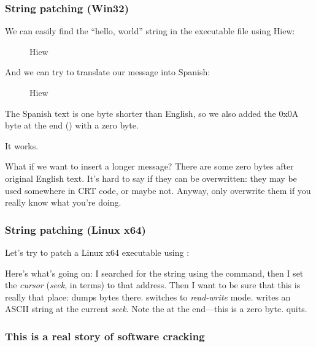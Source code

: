 \subsubsection{String patching (Win32)}

We can easily find the ``hello, world'' string in the executable file using Hiew:

\begin{figure}[H]
\centering
{}
\caption{Hiew}
\label{}
\end{figure}

And we can try to translate our message into Spanish:

\begin{figure}[H]
\centering
{}
\caption{Hiew}
\label{}
\end{figure}

The Spanish text is one byte shorter than English, so we also added the 0x0A byte at the end () with a zero byte.

It works.

What if we want to insert a longer message?
There are some zero bytes after original English text.
It's hard to say if they can be overwritten: they may be used somewhere in \ac{CRT} code, or maybe not.
Anyway, only overwrite them if you really know what you're doing.

\subsubsection{String patching (Linux x64)}

\myindex{\radare}
Let's try to patch a Linux x64 executable using \radare{}:



Here's what's going on: I searched for the  string using the \TT{/} command,
then I set the \emph{cursor} (\emph{seek}, in \radare{} terms) to that address.
Then I want to be sure that this is really that place:  dumps bytes there.
 switches \radare{} to \emph{read-write} mode.
 writes an ASCII string at the current \emph{seek}.
Note the  at the end---this is a zero byte.
 quits.

\subsubsection{This is a real story of software cracking}
\label{\SoftwareCracking}

